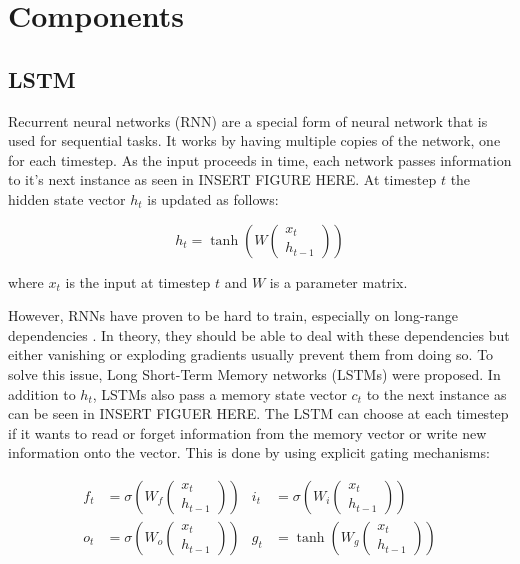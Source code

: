 \section{Components}

\subsection{LSTM}

Recurrent neural networks (RNN) are a special form of neural network that is used for sequential tasks. It works by having multiple copies of the network, one for each timestep. As the input proceeds in time, each network passes information to it's next instance as seen in INSERT FIGURE HERE. At timestep \(t\) the hidden state vector \(h_t\) is updated as follows:

\begin{equation*}
  h_t = \tanh( W \begin{pmatrix} x_t \\ h_{t-1} \end{pmatrix})
\end{equation*}

\noindent where \(x_t\) is the input at timestep \(t\) and \(W\) is a parameter matrix.

However, RNNs have proven to be hard to train, especially on long-range dependencies \cite{hochreiter_rnn}. In theory, they should be able to deal with these dependencies but either vanishing or exploding gradients usually prevent them from doing so. To solve this issue, Long Short-Term Memory networks (LSTMs) \cite{lstm} were proposed. In addition to \(h_t\), LSTMs also pass a memory state vector \(c_t\) to the next instance as can be seen in INSERT FIGUER HERE. The LSTM can choose at each timestep if it wants to read or forget information from the memory vector or write new information onto the vector. This is done by using explicit gating mechanisms:

\begin{align*}
  f_t &= \sigma(W_f \begin{pmatrix} x_t \\ h_{t-1} \end{pmatrix}) &
  i_t &= \sigma(W_i \begin{pmatrix} x_t \\ h_{t-1} \end{pmatrix}) \\
  o_t &= \sigma(W_o \begin{pmatrix} x_t \\ h_{t-1} \end{pmatrix}) &
  g_t &= \tanh(W_g \begin{pmatrix} x_t \\ h_{t-1} \end{pmatrix})
\end{align*}

